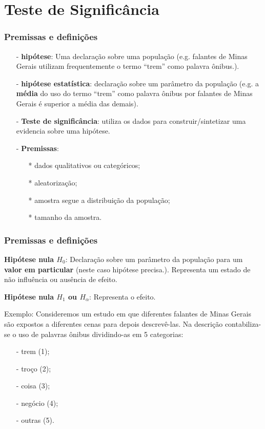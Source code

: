 \documentclass[graphics,14pt]{beamer}
\begin{document}
\section[Teste de Significância]{Teste de Significância}
\begin{frame}[t,fragile=singleslide]
\frametitle{Premissas e definições}
	\begin{itemize}
		\item[-] \textbf{hipótese}: Uma declaração sobre uma população (e.g. falantes de Minas Gerais utilizam frequentemente o termo ``trem'' como palavra ônibus.).
		\item[-] \textbf{hipótese estatística}: declaração sobre um parâmetro da população (e.g. a \textbf{média} do uso do termo ``trem'' como palavra ônibus por falantes de Minas Gerais é superior a média das demais).
		\item[-] \textbf{Teste de significância}: utiliza os dados para construir/sintetizar uma evidencia sobre uma hipótese.
		\item[-] \textbf{Premissas}:
		\begin{itemize}
			\item[*] dados qualitativos ou categóricos;
			\item[*] aleatorização;
			\item[*] amostra segue a distribuição da população;
			\item[*] tamanho da amostra.
		\end{itemize}
	\end{itemize}

\end{frame}
\begin{frame}[t,fragile=singleslide]
\frametitle{Premissas e definições}

	\textbf{Hipótese nula $H_0$}: Declaração sobre um parâmetro da população para um \textbf{valor em particular} (neste caso hipótese precisa.). Representa um estado de não influência ou ausência de efeito. 
	
	\textbf{Hipótese nula $H_1$ ou $H_\alpha$}: Representa o efeito. 
	
	Exemplo: Consideremos um estudo em que diferentes falantes de Minas Gerais são expostos a diferentes cenas para depois descrevê-las. Na descrição contabiliza-se o uso de palavras ônibus dividindo-as em 5 categorias:
	
	\begin{itemize}
		\item[-] trem (1);
		\item[-] troço (2);
		\item[-] coisa (3);
		\item[-] negócio (4);
		\item[-] outras (5).
	\end{itemize}	
	
\end{frame}
\end{document}
